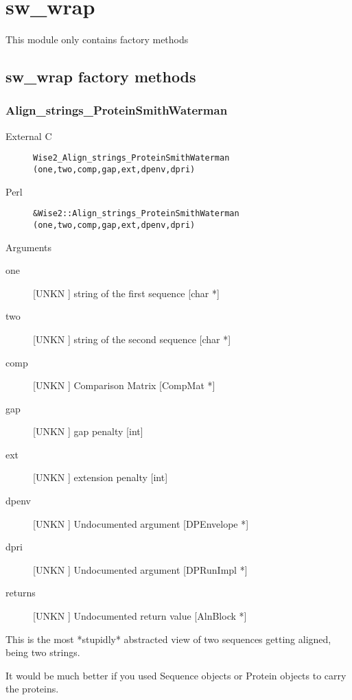 \section{sw_wrap}
\label{module_sw_wrap}
This module only contains factory methods

\subsection{sw_wrap factory methods}
\subsubsection{Align_strings_ProteinSmithWaterman}
\begin{description}
\item[External C] {\tt Wise2_Align_strings_ProteinSmithWaterman (one,two,comp,gap,ext,dpenv,dpri)}
\item[Perl] {\tt &Wise2::Align_strings_ProteinSmithWaterman (one,two,comp,gap,ext,dpenv,dpri)}

\end{description}
Arguments
\begin{description}
\item[one] [UNKN ] string of the first sequence [char *]
\item[two] [UNKN ] string of the second sequence [char *]
\item[comp] [UNKN ] Comparison Matrix [CompMat *]
\item[gap] [UNKN ] gap penalty [int]
\item[ext] [UNKN ] extension penalty [int]
\item[dpenv] [UNKN ] Undocumented argument [DPEnvelope *]
\item[dpri] [UNKN ] Undocumented argument [DPRunImpl *]
\item[returns] [UNKN ] Undocumented return value [AlnBlock *]
\end{description}
This is the most *stupidly* abstracted view of two sequences
getting aligned, being two strings.


It would be much better if you used Sequence objects or Protein
objects to carry the proteins.


